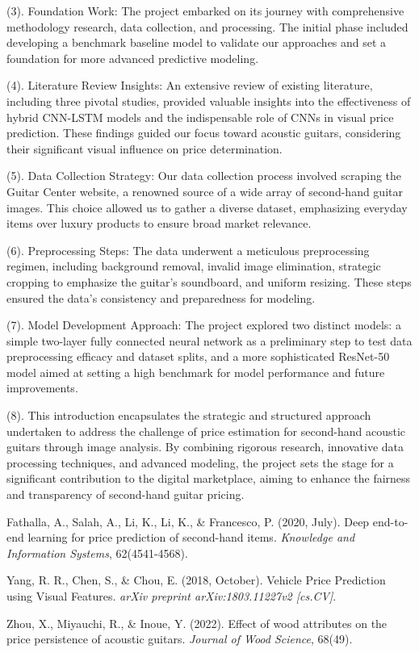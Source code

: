 \documentclass[conference]{IEEEtran}
\begin{document}
(3).	Foundation Work: The project embarked on its journey with comprehensive methodology research, data collection, and processing. The initial phase included developing a benchmark baseline model to validate our approaches and set a foundation for more advanced predictive modeling.

(4).	Literature Review Insights: An extensive review of existing literature, including three pivotal studies, provided valuable insights into the effectiveness of hybrid CNN-LSTM models and the indispensable role of CNNs in visual price prediction. These findings guided our focus toward acoustic guitars, considering their significant visual influence on price determination.

(5).	Data Collection Strategy: Our data collection process involved scraping the Guitar Center website, a renowned source of a wide array of second-hand guitar images. This choice allowed us to gather a diverse dataset, emphasizing everyday items over luxury products to ensure broad market relevance.

(6).	Preprocessing Steps: The data underwent a meticulous preprocessing regimen, including background removal, invalid image elimination, strategic cropping to emphasize the guitar's soundboard, and uniform resizing. These steps ensured the data's consistency and preparedness for modeling.

(7).	Model Development Approach: The project explored two distinct models: a simple two-layer fully connected neural network as a preliminary step to test data preprocessing efficacy and dataset splits, and a more sophisticated ResNet-50 model aimed at setting a high benchmark for model performance and future improvements.

(8).	This introduction encapsulates the strategic and structured approach undertaken to address the challenge of price estimation for second-hand acoustic guitars through image analysis. By combining rigorous research, innovative data processing techniques, and advanced modeling, the project sets the stage for a significant contribution to the digital marketplace, aiming to enhance the fairness and transparency of second-hand guitar pricing.


\begin{thebibliography}{00}

 Fathalla, A., Salah, A., Li, K., Li, K., \& Francesco, P. (2020, July). Deep end-to-end learning for price prediction of second-hand items. \textit{Knowledge and Information Systems}, 62(4541-4568).

 Yang, R. R., Chen, S., \& Chou, E. (2018, October). Vehicle Price Prediction using Visual Features. \textit{arXiv preprint arXiv:1803.11227v2 [cs.CV]}.

 Zhou, X., Miyauchi, R., \& Inoue, Y. (2022). Effect of wood attributes on the price persistence of acoustic guitars. \textit{Journal of Wood Science}, 68(49).

\end{thebibliography}
\end{document}
